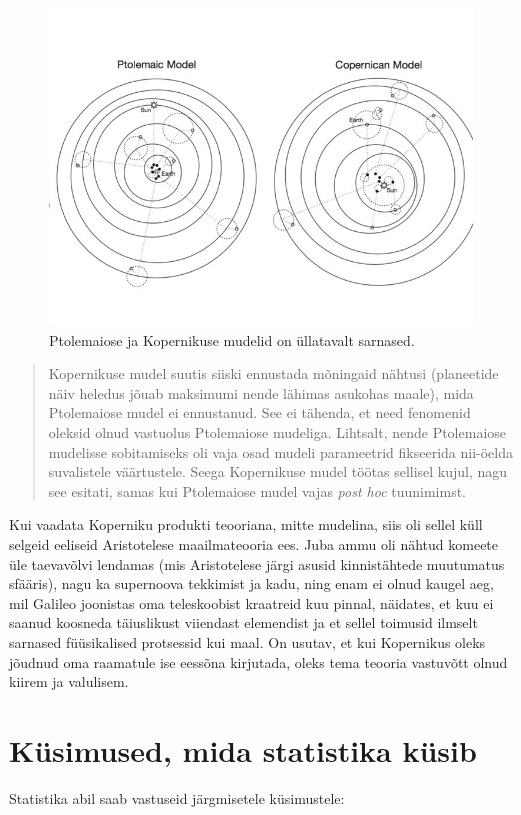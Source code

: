 \documentclass[]{book}
\begin{document}
\begin{figure}
\includegraphics[width=0.5\linewidth]{img/kop} \caption{Ptolemaiose ja Kopernikuse mudelid on üllatavalt sarnased.}\label{fig:unnamed-chunk-4}
\end{figure}

\begin{quote}
Kopernikuse mudel suutis siiski ennustada mõningaid nähtusi (planeetide
näiv heledus jõuab maksimumi nende lähimas asukohas maale), mida
Ptolemaiose mudel ei ennustanud. See ei tähenda, et need fenomenid
oleksid olnud vastuolus Ptolemaiose mudeliga. Lihtsalt, nende
Ptolemaiose mudelisse sobitamiseks oli vaja osad mudeli parameetrid
fikseerida nii-öelda suvalistele väärtustele. Seega Kopernikuse mudel
töötas sellisel kujul, nagu see esitati, samas kui Ptolemaiose mudel
vajas \emph{post hoc} tuunimimst.
\end{quote}

Kui vaadata Koperniku produkti teooriana, mitte mudelina, siis oli
sellel küll selgeid eeliseid Aristotelese maailmateooria ees. Juba ammu
oli nähtud komeete üle taevavõlvi lendamas (mis Aristotelese järgi
asusid kinnistähtede muutumatus sfääris), nagu ka supernoova tekkimist
ja kadu, ning enam ei olnud kaugel aeg, mil Galileo joonistas oma
teleskoobist kraatreid kuu pinnal, näidates, et kuu ei saanud koosneda
täiuslikust viiendast elemendist ja et sellel toimusid ilmselt sarnased
füüsikalised protsessid kui maal. On usutav, et kui Kopernikus oleks
jõudnud oma raamatule ise eessõna kirjutada, oleks tema teooria
vastuvõtt olnud kiirem ja valulisem.

\chapter{Küsimused, mida statistika
küsib}\label{kusimused-mida-statistika-kusib}

Statistika abil saab vastuseid järgmisetele küsimustele:
\end{document}
